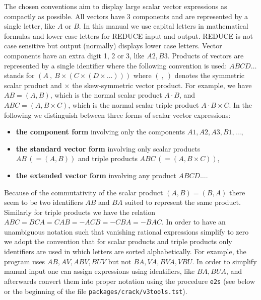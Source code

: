 The chosen conventions aim to display large scalar vector expressions
as compactly as possible.  All vectors have 3 components and are
represented by a single letter, like $A$ or $B$.  In this manual we
use capital letters in mathematical formulas and lower case letters
for REDUCE input and output.  REDUCE is not case sensitive but output
(normally) displays lower case letters.  Vector components have an
extra digit 1, 2 or 3, like $A2, B3$.  Products of vectors are
represented by a single identifier where the following convention is
used: $\mathit{ABCD}\ldots$ stands for $(A\ ,\ B \times (C \times (D
\times\ldots)))$ where $(\ ,\ )$ denotes the symmetric scalar product
and $\times$ the skew-symmetric vector product.  For example, we have
$\mathit{AB} = (A,B)$, which is the normal scalar product $A \cdot B$,
and $\mathit{ABC}=(A,B\times C)$, which is the normal scalar triple
product $A \cdot B \times C$.  In the following we distinguish between
three forms of scalar vector expressions:
\begin{itemize}
\item \textbf{the component form} involving only the components
  $A1,A2,A3,B1,\ldots$,
\item \textbf{the standard vector form} involving only scalar products
  $\mathit{AB}\,(=(A,B))$ and triple products $\mathit{ABC}\,(=(A,B
  \times C))$,
\item \textbf{the extended vector form} involving any product
  $\mathit{ABCD}\ldots$.
\end{itemize}

Because of the commutativity of the scalar product $(A,B)=(B,A)$ there
seem to be two identifiers $\mathit{AB}$ and $\mathit{BA}$ suited to
represent the same product.  Similarly for triple products we have the
relation
$\mathit{ABC}=\mathit{BCA}=\mathit{CAB}=-\mathit{ACB}=-\mathit{CBA}=-\mathit{BAC}$.
In order to have an unambiguous notation such that vanishing rational
expressions simplify to zero we adopt the convention that for scalar
products and triple products only identifiers are used in which
letters are sorted alphabetically.  For example, the program uses
$\mathit{AB},\mathit{AV},\mathit{ABV},\mathit{BUV}$ but not
$\mathit{BA},\mathit{VA},\mathit{BVA},\mathit{VBU}$.  In order to
simplify manual input one can assign expressions using identifiers,
like $\mathit{BA},\mathit{BUA}$, and afterwards convert them into
proper notation using the procedure \texttt{e2s} (see below or the
beginning of the file \texttt{packages/crack/v3tools.tst}).

